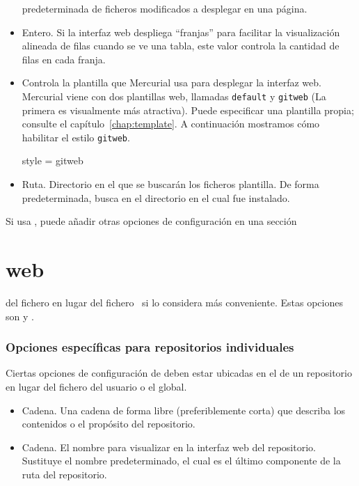 \begin{itemize}
  predeterminada de ficheros modificados a desplegar en una página.
\item[\rcitem{web}{stripes}] Entero.  Si la interfaz web despliega
  ``franjas'' para facilitar la visualización alineada de filas cuando
  se ve una tabla, este valor controla la cantidad de filas en cada
  franja.
\item[\rcitem{web}{style}] Controla la plantilla que Mercurial usa para
  desplegar la interfaz web.  Mercurial viene con dos plantillas web,
  llamadas \texttt{default} y \texttt{gitweb} (La primera es
  visualmente más atractiva).  Puede especificar una plantilla propia;
  consulte el capítulo~\ref{chap:template}.  A continuación mostramos
  cómo habilitar el estilo \texttt{gitweb}.
  \begin{codesample4}
    [web]
    style = gitweb
  \end{codesample4}
\item[\rcitem{web}{templates}] Ruta.  Directorio en el que se buscarán
  los ficheros plantilla.  De forma predeterminada, busca en el
  directorio en el cual fue instalado.
\end{itemize}
Si usa , puede añadir otras opciones de
configuración en una sección \section{web} del fichero
 en lugar del fichero \hgrc\, si lo considera
más conveniente.  Estas opciones son  y
.

\subsubsection{Opciones específicas para repositorios individuales}

Ciertas opciones de configuración de  deben estar
ubicadas en el  de un repositorio en lugar del
fichero del usuario o el \hgrc global.
\begin{itemize}
\item[\rcitem{web}{description}] Cadena.  Una cadena de forma
  libre (preferiblemente corta) que describa los contenidos o el
  propósito del repositorio.
\item[\rcitem{web}{name}] Cadena.  El nombre para visualizar en la
  interfaz web del repositorio. Sustituye el nombre predeterminado, el
  cual es el último componente de la ruta del repositorio.
\end{itemize}

